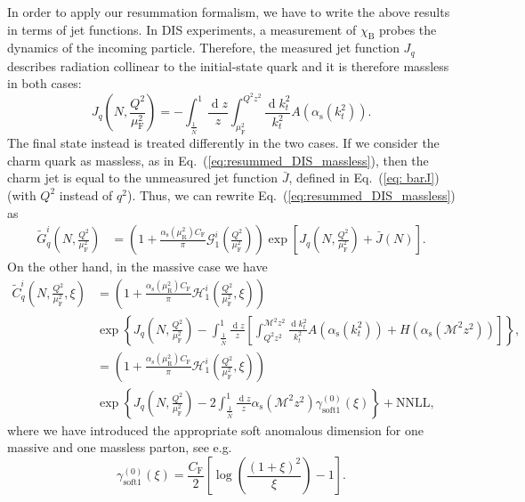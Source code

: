 \documentclass[letterpaper,11pt]{article}
\newcommand{\as}{\alpha_\text{s}}
\newcommand{\cf}{C_{\text{F}}}
\DeclareMathOperator{\De}{d}
\newcommand{\de}{\De\!}
\newcommand{\gszeroMm}{\gamma_\text{soft1}^{(0)}}
\newcommand{\muf}{\mu_{\text{F}}}
\newcommand{\mur}{\mu_{\text{R}}}
\begin{document}
In order to apply our resummation formalism, we have to write the above results in terms of jet functions. 
%
In DIS experiments, a measurement of $\chi_\text{B}$ probes the dynamics of the incoming particle.
%
Therefore, the measured jet function $J_q$ describes radiation collinear to the initial-state quark and it is therefore massless in both cases:
\begin{equation}\label{eq:massless-jet-function}
J_q\left(N,\frac{Q^2}{\muf^2}\right)=-\int^{1}_{{\frac{1}{ \bar N}}} \frac{\de z}{z} \int^{Q^2 z^2}_{\muf^2} \frac{\de k_t^2}{k_t^2} A\left(\as(k_t^2)\right).
\end{equation}
%
The final state instead is treated differently in the two cases. If we consider the charm quark as massless, as in Eq.~(\ref{eq:resummed_DIS_massless}), then the charm jet is equal to the unmeasured jet function $\bar J$, defined in Eq.~(\ref{eq: barJ}) (with $Q^2$ instead of $q^2$). Thus, we can rewrite Eq.~(\ref{eq:resummed_DIS_massless}) as
\begin{align}\label{eq:resummed_DIS_massless_bis}
\widetilde{G}^{i}_q\left(N,\frac{Q^2}{\muf^2}\right)&
=\left(1+ \frac{\as(\mur^2)\cf }{\pi}\mathcal{G}^i_1\left(\frac{Q^2}{\muf^2}\right)\right) \exp\left [ J_q\left(N,\frac{Q^2}{\muf^2}\right)+\bar J(N)\right].
\end{align}
On the other hand, in the massive case we have 
\begin{align}\label{eq:resummed_DIS_massive_bis}
\widetilde{C}^i_q\left(N,\frac{Q^2}{\muf^2},\xi\right)&= \left(1+ \frac{\as(\mur^2)\cf }{\pi}\mathcal{H}^i_1\left(\frac{Q^2}{\muf^2},\xi\right)\right) \nonumber \\
&
\exp\left\{J_q\left(N,\frac{Q^2}{\muf^2}\right)-\int^{1}_{\frac{1}{\bar N}} \frac{\de z}{z} \left[\int^{\mathcal{M}^2 z^2}_{Q^2 z^2} \frac{\de k_t^2}{k_t^2} A\left(\as(k_t^2)\right)+H\left(\as\left(\mathcal{M}^2z^2\right)\right)\right]\right\},
\nonumber\\
&= \left(1+ \frac{\as(\mur^2)\cf }{\pi}\mathcal{H}^i_1\left(\frac{Q^2}{\muf^2},\xi\right)\right) \nonumber \\
&
\exp\left\{J_q\left(N,\frac{Q^2}{\muf^2}\right)-2 \int^{1}_{\frac{1}{\bar N}} \frac{\de z}{z}  \as\left(\mathcal{M}^2z^2\right)
	\gszeroMm(\xi)\right\}+\text{NNLL},
\end{align}
where we have introduced the appropriate soft anomalous dimension for one massive and one massless parton, see e.g.~\cite{Kidonakis:2020gxo}  
\begin{equation}
 	\gszeroMm(\xi)=\frac{\cf}{2}\left[\log{\left(\frac{(1+\xi)^2}{\xi}\right)}-1\right].
 \end{equation} 
\end{document}
